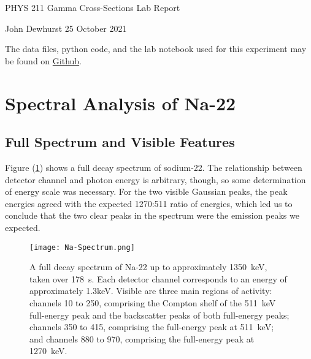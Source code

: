 \documentclass[letter]{article}
\begin{document}

\begin{center}
	{\large PHYS 211 Gamma Cross-Sections Lab Report}
	
	John Dewhurst \hspace{1cm}
	25 October 2021
	
	\vspace{5mm}
	
	The data files, python code, and the lab notebook used for this experiment may be found on \href{https://github.com/jmdewhurst/PHYS211.git}{Github}.
	
	\vspace{1em}
\end{center}
	


\section{Spectral Analysis of Na-22}

\subsection{Full Spectrum and Visible Features}


Figure (\ref{fig:NaFullSpec}) shows a full decay spectrum of sodium-22. The relationship between detector channel and photon energy is arbitrary, though, so some determination of energy scale was necessary. For the two visible Gaussian peaks, the peak energies agreed with the expected 1270:511 ratio of energies, which led us to conclude that the two clear peaks in the spectrum were the emission peaks we expected.

\begin{figure}[h] \centering
    \texttt{[image: Na-Spectrum.png]}
    \caption{A full decay spectrum of Na-22 up to approximately \qty{1350}{\kilo\electronvolt}, taken over \qty{178}{\second}. Each detector channel corresponds to an energy of approximately 1.3keV. Visible are three main regions of activity: channels 10 to 250, comprising the Compton shelf of the \qty{511}{\kilo\electronvolt} full-energy peak and the backscatter peaks of both full-energy peaks; channels 350 to 415, comprising the full-energy peak at \qty{511}{\kilo\electronvolt}; and channels 880 to 970, comprising the full-energy peak at \qty{1270}{\kilo\electronvolt}.}
    \label{fig:NaFullSpec}
\end{figure}
\end{document}
